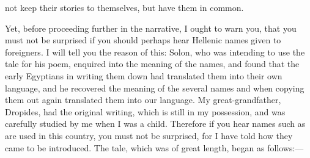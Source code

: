 \documentclass[11pt,letter]{article}
\begin{document}
not keep their stories to themselves, but have them in common.

\par  Yet, before proceeding further in the narrative, I ought to warn you, that you must not be surprised if you should perhaps hear Hellenic names given to foreigners. I will tell you the reason of this: Solon, who was intending to use the tale for his poem, enquired into the meaning of the names, and found that the early Egyptians in writing them down had translated them into their own language, and he recovered the meaning of the several names and when copying them out again translated them into our language. My great-grandfather, Dropides, had the original writing, which is still in my possession, and was carefully studied by me when I was a child. Therefore if you hear names such as are used in this country, you must not be surprised, for I have told how they came to be introduced. The tale, which was of great length, began as follows:—
\end{document}
